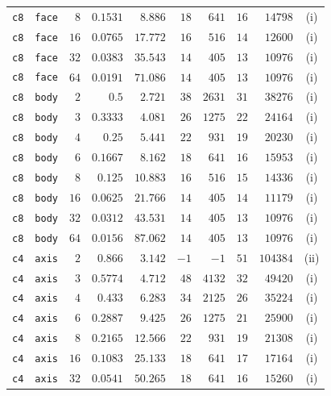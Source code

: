 \begin{longtable}{llrrrrrrrc}
\texttt{c8} & \texttt{face} & $8$ & $0.1531$ & $8.886$ & $18$ & $641$ & $16$ & $14798$ & (i) \\
\texttt{c8} & \texttt{face} & $16$ & $0.0765$ & $17.772$ & $16$ & $516$ & $14$ & $12600$ & (i) \\
\texttt{c8} & \texttt{face} & $32$ & $0.0383$ & $35.543$ & $14$ & $405$ & $13$ & $10976$ & (i) \\
\texttt{c8} & \texttt{face} & $64$ & $0.0191$ & $71.086$ & $14$ & $405$ & $13$ & $10976$ & (i) \\
\texttt{c8} & \texttt{body} & $2$ & $0.5$ & $2.721$ & $38$ & $2631$ & $31$ & $38276$ & (i) \\
\texttt{c8} & \texttt{body} & $3$ & $0.3333$ & $4.081$ & $26$ & $1275$ & $22$ & $24164$ & (i) \\
\texttt{c8} & \texttt{body} & $4$ & $0.25$ & $5.441$ & $22$ & $931$ & $19$ & $20230$ & (i) \\
\texttt{c8} & \texttt{body} & $6$ & $0.1667$ & $8.162$ & $18$ & $641$ & $16$ & $15953$ & (i) \\
\texttt{c8} & \texttt{body} & $8$ & $0.125$ & $10.883$ & $16$ & $516$ & $15$ & $14336$ & (i) \\
\texttt{c8} & \texttt{body} & $16$ & $0.0625$ & $21.766$ & $14$ & $405$ & $14$ & $11179$ & (i) \\
\texttt{c8} & \texttt{body} & $32$ & $0.0312$ & $43.531$ & $14$ & $405$ & $13$ & $10976$ & (i) \\
\texttt{c8} & \texttt{body} & $64$ & $0.0156$ & $87.062$ & $14$ & $405$ & $13$ & $10976$ & (i) \\
\texttt{c4} & \texttt{axis} & $2$ & $0.866$ & $3.142$ & $-1$ & $-1$ & $51$ & $104384$ & (ii) \\
\texttt{c4} & \texttt{axis} & $3$ & $0.5774$ & $4.712$ & $48$ & $4132$ & $32$ & $49420$ & (i) \\
\texttt{c4} & \texttt{axis} & $4$ & $0.433$ & $6.283$ & $34$ & $2125$ & $26$ & $35224$ & (i) \\
\texttt{c4} & \texttt{axis} & $6$ & $0.2887$ & $9.425$ & $26$ & $1275$ & $21$ & $25900$ & (i) \\
\texttt{c4} & \texttt{axis} & $8$ & $0.2165$ & $12.566$ & $22$ & $931$ & $19$ & $21308$ & (i) \\
\texttt{c4} & \texttt{axis} & $16$ & $0.1083$ & $25.133$ & $18$ & $641$ & $17$ & $17164$ & (i) \\
\texttt{c4} & \texttt{axis} & $32$ & $0.0541$ & $50.265$ & $18$ & $641$ & $16$ & $15260$ & (i) \\

\end{longtable}
